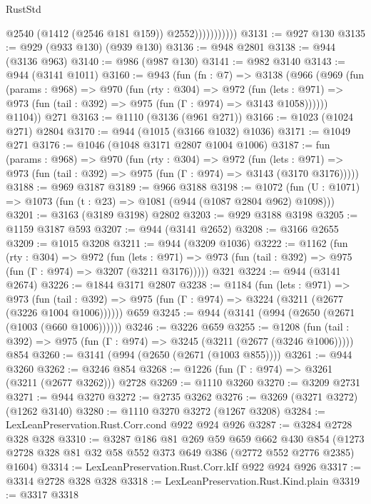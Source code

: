 \begin{lexlean}{RustStd}
\begin{coremodule}
{\begin{coremodule}
{{{{{{{{{{                          @2540
                          (@1412 (@2546 @181 @159))
                          @2552)))))))))))
@3131 := @927 @130
@3135 := @929 (@933 @130) (@939 @130)
@3136 := @948 @2801
@3138 := @944 (@3136 @963)
@3140 := @986 (@987 @130)
@3141 := @982 @3140
@3143 := @944 (@3141 @1011)
@3160 := @943
    (fun (fn : @7) =>
    @3138
      (@966
        (@969
          (fun (params : @968) =>
          @970
            (fun (rty : @304) =>
            @972
              (fun (lets : @971) =>
              @973 (fun (tail : @392) => @975 (fun (Γ : @974) => @3143 @1058))))))
        @1104))
    @271
@3163 := @1110 (@3136 (@961 @271))
@3166 := @1023 (@1024 @271) @2804
@3170 := @944 (@1015 (@3166 @1032) @1036)
@3171 := @1049 @271
@3176 := @1046 (@1048 @3171 @2807 @1004 @1006)
@3187 := fun (params : @968) =>
  @970
    (fun (rty : @304) =>
    @972
      (fun (lets : @971) =>
      @973 (fun (tail : @392) => @975 (fun (Γ : @974) => @3143 (@3170 @3176)))))
@3188 := @969 @3187
@3189 := @966 @3188
@3198 := @1072 (fun (U : @1071) => @1073 (fun (t : @23) => @1081 (@944 (@1087 @2804 @962) @1098)))
@3201 := @3163 (@3189 @3198) @2802
@3203 := @929 @3188 @3198
@3205 := @1159 @3187 @593
@3207 := @944 (@3141 @2652)
@3208 := @3166 @2655
@3209 := @1015 @3208
@3211 := @944 (@3209 @1036)
@3222 := @1162
    (fun (rty : @304) =>
    @972
      (fun (lets : @971) =>
      @973 (fun (tail : @392) => @975 (fun (Γ : @974) => @3207 (@3211 @3176)))))
    @321
@3224 := @944 (@3141 @2674)
@3226 := @1844 @3171 @2807
@3238 := @1184
    (fun (lets : @971) =>
    @973 (fun (tail : @392) => @975 (fun (Γ : @974) => @3224 (@3211 (@2677 (@3226 @1004 @1006))))))
    @659
@3245 := @944 (@3141 (@994 (@2650 (@2671 (@1003 (@660 @1006))))))
@3246 := @3226 @659
@3255 := @1208
    (fun (tail : @392) => @975 (fun (Γ : @974) => @3245 (@3211 (@2677 (@3246 @1006)))))
    @854
@3260 := @3141 (@994 (@2650 (@2671 (@1003 @855))))
@3261 := @944 @3260
@3262 := @3246 @854
@3268 := @1226 (fun (Γ : @974) => @3261 (@3211 (@2677 @3262))) @2728
@3269 := @1110 @3260
@3270 := @3209 @2731
@3271 := @944 @3270
@3272 := @2735 @3262
@3276 := @3269 (@3271 @3272) (@1262 @3140)
@3280 := @1110 @3270 @3272 (@1267 @3208)
@3284 := LexLeanPreservation.Rust.Corr.cond @922 @924 @926
@3287 := @3284 @2728 @328 @328
@3310 := @3287
    @186
    @81
    @269
    @59
    @659
    @662
    @430
    @854
    (@1273 @2728 @328 @81 @32 @58 @552 @373 @649 @386 (@2772 @552 @2776 @2385) @1604)
@3314 := LexLeanPreservation.Rust.Corr.kIf @922 @924 @926
@3317 := @3314 @2728 @328 @328
@3318 := LexLeanPreservation.Rust.Kind.plain
@3319 := @3317 @3318
}}}}}}}}}}
\end{coremodule}}
\end{coremodule}
\end{lexlean}
